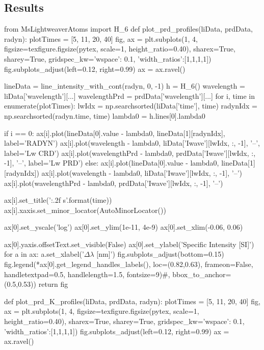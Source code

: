 \subsection{Results}

\begin{pycode}[TimeDepRT]
from MsLightweaverAtoms import H_6
def plot_prd_profiles(liData, prdData, radyn):
    plotTimes = [5, 11, 20, 40]
    fig, ax = plt.subplots(1, 4, figsize=texfigure.figsize(pytex, scale=1, height_ratio=0.40),
                           sharex=True, sharey=True,
                           gridspec_kw={'wspace': 0.1, 'width_ratios':[1,1,1,1]})
    fig.subplots_adjust(left=0.12, right=0.99)
    ax = ax.ravel()

    lineData = line_intensity_with_cont(radyn, 0, -1)
    h = H_6()
    wavelength = liData['wavelength'][...]
    wavelengthPrd = prdData['wavelength'][...]
    for i, time in enumerate(plotTimes):
        lwIdx = np.searchsorted(liData['time'], time)
        radynIdx = np.searchsorted(radyn.time, time)
        lambda0 = h.lines[0].lambda0

        if i == 0:
            ax[i].plot(lineData[0].value - lambda0, lineData[1][radynIdx], label='RADYN')
            ax[i].plot(wavelength - lambda0, liData['Iwave'][lwIdx, :, -1], '--', label='Lw CRD')
            ax[i].plot(wavelengthPrd - lambda0, prdData['Iwave'][lwIdx, :, -1], '--', label='Lw PRD')
        else:
            ax[i].plot(lineData[0].value - lambda0, lineData[1][radynIdx])
            ax[i].plot(wavelength - lambda0, liData['Iwave'][lwIdx, :, -1], '--')
            ax[i].plot(wavelengthPrd - lambda0, prdData['Iwave'][lwIdx, :, -1], '--')

        ax[i].set_title('{:.2f} s'.format(time))
        ax[i].xaxis.set_minor_locator(AutoMinorLocator())

    ax[0].set_yscale('log')
    ax[0].set_ylim(1e-11, 4e-9)
    ax[0].set_xlim(-0.06, 0.06)

    ax[0].yaxis.offsetText.set_visible(False)
    ax[0].set_ylabel('Specific Intensity [SI]')
    for a in ax:
        a.set_xlabel('$\Delta\lambda$ [nm]')
    fig.subplots_adjust(bottom=0.15)
    fig.legend(*ax[0].get_legend_handles_labels(), loc=(0.82,0.63), frameon=False,
               handletextpad=0.5, handlelength=1.5, fontsize=9)#, bbox_to_anchor=(0.5,0.53))
    return fig

def plot_prd_K_profiles(liData, prdData, radyn):
    plotTimes = [5, 11, 20, 40]
    fig, ax = plt.subplots(1, 4, figsize=texfigure.figsize(pytex, scale=1, height_ratio=0.40),
                           sharex=True, sharey=True,
                           gridspec_kw={'wspace': 0.1, 'width_ratios':[1,1,1,1]})
    fig.subplots_adjust(left=0.12, right=0.99)
    ax = ax.ravel()


\end{pycode}
